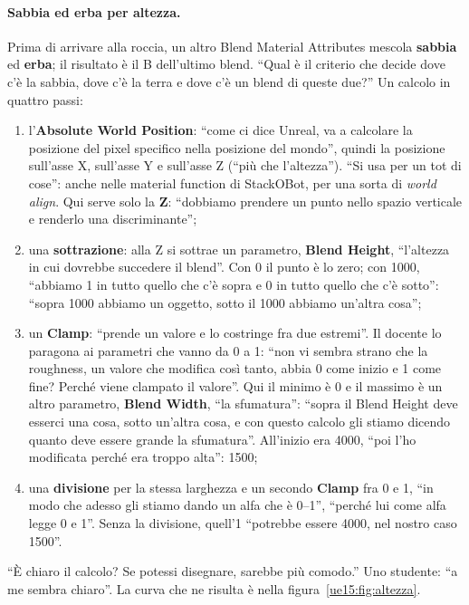 \paragraph{Sabbia ed erba per altezza.} Prima di arrivare alla roccia, un altro Blend
Material Attributes mescola \textbf{sabbia} ed \textbf{erba}; il risultato è il B dell'ultimo
blend. ``Qual è il criterio che decide dove c'è la sabbia, dove c'è la terra e dove c'è un
blend di queste due?'' Un calcolo in quattro passi:
\begin{enumerate}
  \item l'\textbf{Absolute World Position}: ``come ci dice Unreal, va a calcolare la
        posizione del pixel specifico nella posizione del mondo'', quindi la posizione
        sull'asse X, sull'asse Y e sull'asse Z (``più che l'altezza''). ``Si usa per un tot di
        cose'': anche nelle material function di StackOBot, per una sorta di \emph{world
        align}. Qui serve solo la \textbf{Z}: ``dobbiamo prendere un punto nello spazio
        verticale e renderlo una discriminante'';
  \item una \textbf{sottrazione}: alla Z si sottrae un parametro, \textbf{Blend Height},
        ``l'altezza in cui dovrebbe succedere il blend''. Con 0 il punto è lo zero; con
        1000, ``abbiamo 1 in tutto quello che c'è sopra e 0 in tutto quello che c'è sotto'':
        ``sopra 1000 abbiamo un oggetto, sotto il 1000 abbiamo un'altra cosa'';
  \item un \textbf{Clamp}: ``prende un valore e lo costringe fra due estremi''. Il
        docente lo paragona ai parametri che vanno da 0 a 1: ``non vi sembra strano che la
        roughness, un valore che modifica così tanto, abbia 0 come inizio e 1 come fine?
        Perché viene clampato il valore''. Qui il minimo è 0 e il massimo è un altro
        parametro, \textbf{Blend Width}, ``la sfumatura'': ``sopra il Blend Height deve esserci
        una cosa, sotto un'altra cosa, e con questo calcolo gli stiamo dicendo quanto deve
        essere grande la sfumatura''. All'inizio era 4000, ``poi l'ho modificata perché era
        troppo alta'': 1500;
  \item una \textbf{divisione} per la stessa larghezza e un secondo \textbf{Clamp} fra 0 e
        1, ``in modo che adesso gli stiamo dando un alfa che è 0--1'', ``perché lui come alfa
        legge 0 e 1''. Senza la divisione, quell'1 ``potrebbe essere 4000, nel nostro caso
        1500''.
\end{enumerate}
``È chiaro il calcolo? Se potessi disegnare, sarebbe più comodo.'' Uno studente: ``a me sembra
chiaro''. La curva che ne risulta è nella figura~\ref{ue15:fig:altezza}.

